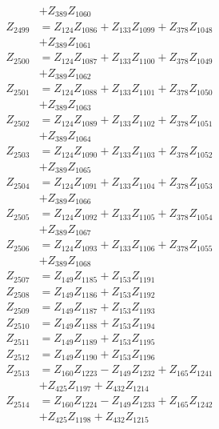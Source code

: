 \begin{multicols}{2}
\begin{align}
&+ Z_{389}Z_{1060} \nonumber \\
Z_{2499} &= Z_{124}Z_{1086} + Z_{133}Z_{1099} + Z_{378}Z_{1048}  \nonumber \\
&+ Z_{389}Z_{1061} \nonumber \\
Z_{2500} &= Z_{124}Z_{1087} + Z_{133}Z_{1100} + Z_{378}Z_{1049}  \nonumber \\
&+ Z_{389}Z_{1062} \nonumber \\
Z_{2501} &= Z_{124}Z_{1088} + Z_{133}Z_{1101} + Z_{378}Z_{1050}  \nonumber \\
&+ Z_{389}Z_{1063} \nonumber \\
Z_{2502} &= Z_{124}Z_{1089} + Z_{133}Z_{1102} + Z_{378}Z_{1051}  \nonumber \\
&+ Z_{389}Z_{1064} \nonumber \\
Z_{2503} &= Z_{124}Z_{1090} + Z_{133}Z_{1103} + Z_{378}Z_{1052}  \nonumber \\
&+ Z_{389}Z_{1065} \nonumber \\
Z_{2504} &= Z_{124}Z_{1091} + Z_{133}Z_{1104} + Z_{378}Z_{1053}  \nonumber \\
&+ Z_{389}Z_{1066} \nonumber \\
Z_{2505} &= Z_{124}Z_{1092} + Z_{133}Z_{1105} + Z_{378}Z_{1054}  \nonumber \\
&+ Z_{389}Z_{1067} \nonumber \\
Z_{2506} &= Z_{124}Z_{1093} + Z_{133}Z_{1106} + Z_{378}Z_{1055}  \nonumber \\
&+ Z_{389}Z_{1068} \nonumber \\
Z_{2507} &= Z_{149}Z_{1185} + Z_{153}Z_{1191} \nonumber \\
Z_{2508} &= Z_{149}Z_{1186} + Z_{153}Z_{1192} \nonumber \\
Z_{2509} &= Z_{149}Z_{1187} + Z_{153}Z_{1193} \nonumber \\
Z_{2510} &= Z_{149}Z_{1188} + Z_{153}Z_{1194} \nonumber \\
Z_{2511} &= Z_{149}Z_{1189} + Z_{153}Z_{1195} \nonumber \\
Z_{2512} &= Z_{149}Z_{1190} + Z_{153}Z_{1196} \nonumber \\
Z_{2513} &= Z_{160}Z_{1223} - Z_{149}Z_{1232} + Z_{165}Z_{1241}  \nonumber \\
&+ Z_{425}Z_{1197} + Z_{432}Z_{1214} \nonumber \\
Z_{2514} &= Z_{160}Z_{1224} - Z_{149}Z_{1233} + Z_{165}Z_{1242}  \nonumber \\
&+ Z_{425}Z_{1198} + Z_{432}Z_{1215} \nonumber \\

\end{align}
\end{multicols}
